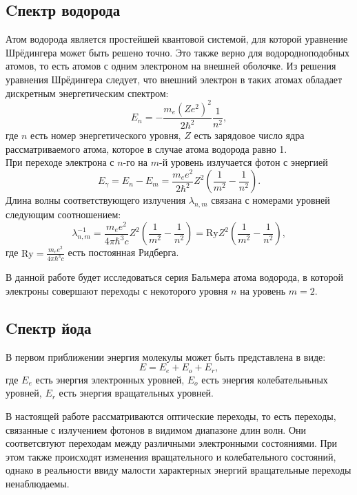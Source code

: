 \documentclass[a4paper,12pt]{article} %
\begin{document}
\subsection{Cпектр водорода}
Атом водорода является простейшей квантовой системой, для которой уравнение Шрёдингера может быть решено точно. Это также верно для водородноподобных атомов, то есть атомов с одним электроном на внешней оболочке. Из решения уравнения Шрёдингера следует, что внешний электрон в таких атомах обладает дискретным энергетическим спектром:  
\begin{equation}
	E_n = - \frac{m_e (Z e^2)^2}{2\hbar^2}\frac{1}{n^2},
\end{equation}
где $n$ есть номер энергетического уровня, $Z$ есть зарядовое число ядра рассматриваемого атома, которое в случае атома водорода равно 1.\\
При переходе электрона с $n$-го на $m$-й уровень излучается фотон с энергией
\begin{equation}
	E_\gamma = E_n - E_m = \frac{m_ee^2}{2\hbar^2}Z^2\left(\frac{1}{m^2} - \frac{1}{n^2}\right).
\end{equation}
Длина волны  соответствующего излучения $\lambda_{n,m}$ связана с номерами уровней следующим соотношением:
\begin{equation}
	\label{eq:Ry}
	\lambda_{n,m}^{-1} =\frac{m_ee^2}{4\pi\hbar^3c}Z^2\left(\frac{1}{m^2}-\frac{1}{n^2}\right) = \text{Ry} Z^2 \left(\frac{1}{m^2}-\frac{1}{n^2}\right),
\end{equation}
где $\text{Ry} = \frac{m_ee^2}{4\pi\hbar^3c}$ есть постоянная Ридберга.

В данной работе будет исследоваться серия Бальмера атома водорода, в которой электроны совершают переходы с некоторого уровня $n$ на уровень $m = 2$.
\subsection{Cпектр йода}
В первом приближении энергия молекулы может быть представлена в виде:
\begin{equation}
	E=E_e+E_o+E_r,
\end{equation}
где $E_e$ есть энергия электронных уровней, $E_o$ есть энергия колебательньных уровней, $E_r$ есть энергия вращательных уровней.

В настоящей работе рассматриваются оптические переходы, то есть переходы, связанные с излучением фотонов в видимом диапазоне длин волн. Они соответсвтуют переходам между различными электронными состояниями. При этом также происходят изменения вращательного и колебательного состояний, однако в реальности ввиду малости характерных энергий вращательные переходы ненаблюдаемы.
\end{document}
